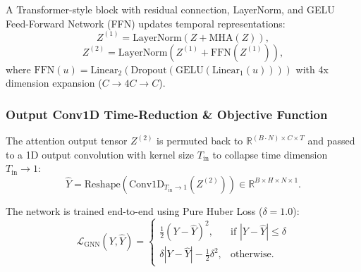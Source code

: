 A Transformer-style block \cite{attention} with residual connection, LayerNorm, and GELU Feed-Forward Network (FFN) updates temporal representations:
\begin{equation}
Z^{(1)} = \text{LayerNorm}\left( Z + \text{MHA}(Z) \right),
\end{equation}
\begin{equation}
Z^{(2)} = \text{LayerNorm}\left( Z^{(1)} + \text{FFN}(Z^{(1)}) \right),
\end{equation}
where $\text{FFN}(u) = \text{Linear}_{2}\left( \text{Dropout}\left( \text{GELU}\left( \text{Linear}_{1}(u) \right) \right) \right)$ with 4x dimension expansion ($C \to 4C \to C$).

\subsubsection{Output Conv1D Time-Reduction \& Objective Function}
The attention output tensor $Z^{(2)}$ is permuted back to $\mathbb{R}^{(B \cdot N) \times C \times T}$ and passed to a 1D output convolution with kernel size $T_{\text{in}}$ to collapse time dimension $T_{\text{in}} \to 1$:
\begin{equation}
\hat{Y} = \text{Reshape}\left( \text{Conv1D}_{T_{\text{in}} \to 1}\left(Z^{(2)}\right) \right) \in \mathbb{R}^{B \times H \times N \times 1}.
\end{equation}

The network is trained end-to-end using Pure Huber Loss \cite{huber} ($\delta = 1.0$):
\begin{equation}
\mathcal{L}_{\text{GNN}}(Y, \hat{Y}) = \begin{cases} \frac{1}{2}(Y - \hat{Y})^2, & \text{if } |Y - \hat{Y}| \le \delta \\ \delta |Y - \hat{Y}| - \frac{1}{2}\delta^2, & \text{otherwise.} \end{cases}
\end{equation}
